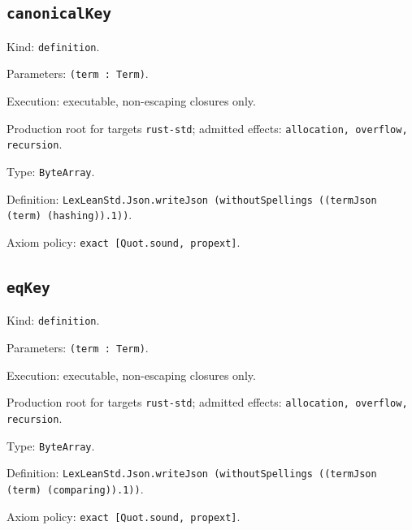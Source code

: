 \documentclass[11pt]{article}
\begin{document}
\subsection*{\texttt{canonicalKey}}
\noindent Kind: \texttt{definition}.\par
\noindent Parameters: \texttt{(term : Term)}.\par
\noindent Execution: executable, non-escaping closures only.\par
\noindent Production root for targets \texttt{rust-std}; admitted effects: \texttt{allocation, overflow, recursion}.\par
\noindent Type: \texttt{ByteArray}.\par
\noindent Definition: \texttt{LexLeanStd.Json.writeJson (withoutSpellings ((termJson (term) (hashing)).1))}.\par
\noindent Axiom policy: \texttt{exact [Quot.sound, propext]}.\par
\subsection*{\texttt{eqKey}}
\noindent Kind: \texttt{definition}.\par
\noindent Parameters: \texttt{(term : Term)}.\par
\noindent Execution: executable, non-escaping closures only.\par
\noindent Production root for targets \texttt{rust-std}; admitted effects: \texttt{allocation, overflow, recursion}.\par
\noindent Type: \texttt{ByteArray}.\par
\noindent Definition: \texttt{LexLeanStd.Json.writeJson (withoutSpellings ((termJson (term) (comparing)).1))}.\par
\noindent Axiom policy: \texttt{exact [Quot.sound, propext]}.\par
\end{document}
